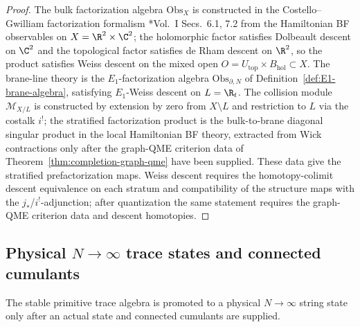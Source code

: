 \begin{proof}
The bulk factorization algebra \(\mathrm{Obs}_X\) is constructed in the
Costello--Gwilliam factorization formalism
\cite{costello-gwilliam}*{Vol.~I Secs.~6.1, 7.2} from the Hamiltonian
BF observables on \(X=\R^2\times\C^2\); the holomorphic factor satisfies
Dolbeault descent on \(\C^2\) and the topological factor satisfies
de Rham descent on \(\R^2\), so the product satisfies Weiss
descent on the mixed open
\(O=U_{\mathrm{top}}\times B_{\mathrm{hol}}\subset X\).  The
brane-line theory is the \(E_1\)-factorization algebra
\(\mathrm{Obs}_{\partial,N}\) of
Definition~\ref{def:E1-brane-algebra}, satisfying \(E_1\)-Weiss
descent on \(L=\R_t\).  The collision module
\(\mathcal M_{X/L}\) is constructed by extension by zero from
\(X\setminus L\) and restriction to \(L\) via the costalk \(i^!\);
the stratified factorization product is the bulk-to-brane
diagonal singular product in the local Hamiltonian BF theory,
extracted from Wick contractions only after the graph-QME criterion data
of Theorem~\ref{thm:completion-graph-qme} have been supplied.  These data give
the stratified prefactorization maps.  Weiss descent requires the
homotopy-colimit descent equivalence on each stratum and compatibility
of the structure maps with the \(j_*\)/\(i^!\)-adjunction; after
quantization the same statement requires the graph-QME criterion data
and descent homotopies.
\end{proof}

\subsection{\texorpdfstring{Physical \(N\to\infty\) trace states and connected cumulants}{Physical N-to-infinity trace states and connected cumulants}}
\label{ssec:completion-large-N}

The stable primitive trace algebra is promoted to a physical
\(N\to\infty\) string state only after an actual state and connected
cumulants are supplied.


